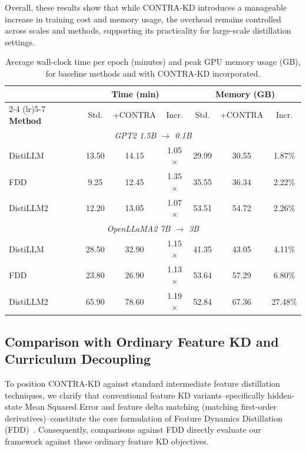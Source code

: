 \documentclass{article} %
\theoremstyle{definition}
\theoremstyle{remark}
\begin{document}
Overall, these results show that while CONTRA-KD introduces a manageable increase in training cost and memory usage, the overhead remains controlled across scales and methods, supporting its practicality for large-scale distillation settings.

\begin{table}[h]
\centering
\small
\caption{Average wall-clock time per epoch (minutes) and peak GPU memory usage (GB), for baseline methods and with CONTRA-KD incorporated.}
\label{tab:time_memory}
\vspace{0.5em}
\begin{tabular}{lccc ccc}
\toprule
& \multicolumn{3}{c}{\textbf{Time (min)}} & \multicolumn{3}{c}{\textbf{Memory (GB)}} \\
\cmidrule(lr){2-4} \cmidrule(lr){5-7}
\textbf{Method} & Std. & +CONTRA & Incr. & Std. & +CONTRA & Incr. \\
\midrule
\multicolumn{7}{c}{\textit{GPT2 1.5B $\rightarrow$ 0.1B}} \\
\midrule
DistiLLM  & 13.50 & 14.15 & 1.05$\times$ & 29.99 & 30.55 & 1.87\% \\
FDD       & 9.25  & 12.45 & 1.35$\times$ & 35.55 & 36.34 & 2.22\% \\
DistiLLM2 & 12.20 & 13.05 & 1.07$\times$ & 53.51 & 54.72 & 2.26\% \\
\midrule
\multicolumn{7}{c}{\textit{OpenLLaMA2 7B $\rightarrow$ 3B}} \\
\midrule
DistiLLM  & 28.50 & 32.90 & 1.15$\times$ & 41.35 & 43.05 & 4.11\% \\
FDD       & 23.80 & 26.90 & 1.13$\times$ & 53.64 & 57.29 & 6.80\% \\
DistiLLM2 & 65.90 & 78.60 & 1.19$\times$ & 52.84 & 67.36 & 27.48\% \\
\bottomrule
\end{tabular}
\end{table}

\subsection{Comparison with Ordinary Feature KD and Curriculum Decoupling}
\label{sec:ablation_feature_kd}

To position CONTRA-KD against standard intermediate feature distillation techniques, we clarify that conventional feature KD variants--specifically hidden-state Mean Squared Error and feature delta matching (matching first-order derivatives)--constitute the core formulation of Feature Dynamics Distillation (FDD)~\citep{gong-etal-2025-beyond}. Consequently, comparisons against FDD directly evaluate our framework against these ordinary feature KD objectives.
\end{document}
